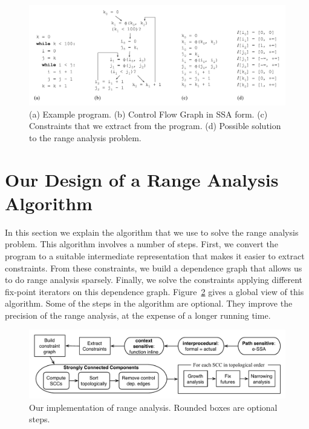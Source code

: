 \documentclass[times]{speauth}
\begin{document}
\begin{figure}[t!]
\begin{center}
\includegraphics[width=1\textwidth]{images/ex1}
\end{center}
\caption{\label{fig:ex1}
(a) Example program.
(b) Control Flow Graph in SSA form.
(c) Constraints that we extract from the program.
(d) Possible solution to the range analysis problem.}
\end{figure}

\section{Our Design of a Range Analysis Algorithm}
\label{sec:algo}


In this section we explain the algorithm that we use to solve the range
analysis problem.
This algorithm involves a number of steps.
First, we convert the program to a suitable intermediate representation that
makes it easier to extract constraints.
From these constraints, we build a dependence graph that allows us to do
range analysis sparsely.
Finally, we solve the constraints applying different fix-point iterators on
this dependence graph.
Figure~\ref{fig:algorithm} gives a global view of this algorithm.
Some of the steps in the algorithm are optional.
They improve the precision of the range analysis, at the expense of a longer
running time.

\begin{figure}[t!]
\begin{center}
\includegraphics[width=1\textwidth]{images/algorithm}
\end{center}
\caption{\label{fig:algorithm}
Our implementation of range analysis.
Rounded boxes are optional steps.}
\end{figure}
\end{document}
